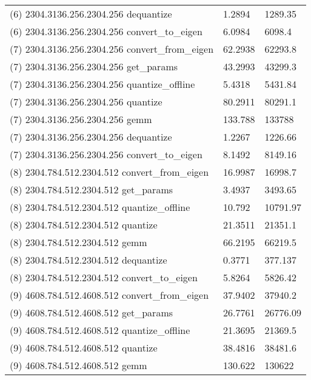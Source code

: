 \begin{longtable}{lll}
(6) 2304.3136.256.2304.256 dequantize            & 1.2894         & 1289.35          \\
(6) 2304.3136.256.2304.256 convert\_to\_eigen    & 6.0984         & 6098.4           \\
(7) 2304.3136.256.2304.256 convert\_from\_eigen  & 62.2938        & 62293.8          \\
(7) 2304.3136.256.2304.256 get\_params           & 43.2993        & 43299.3          \\
(7) 2304.3136.256.2304.256 quantize\_offline     & 5.4318         & 5431.84          \\
(7) 2304.3136.256.2304.256 quantize              & 80.2911        & 80291.1          \\
(7) 2304.3136.256.2304.256 gemm                  & 133.788        & 133788           \\
(7) 2304.3136.256.2304.256 dequantize            & 1.2267         & 1226.66          \\
(7) 2304.3136.256.2304.256 convert\_to\_eigen    & 8.1492         & 8149.16          \\
(8) 2304.784.512.2304.512 convert\_from\_eigen   & 16.9987        & 16998.7          \\
(8) 2304.784.512.2304.512 get\_params            & 3.4937         & 3493.65          \\
(8) 2304.784.512.2304.512 quantize\_offline      & 10.792         & 10791.97         \\
(8) 2304.784.512.2304.512 quantize               & 21.3511        & 21351.1          \\
(8) 2304.784.512.2304.512 gemm                   & 66.2195        & 66219.5          \\
(8) 2304.784.512.2304.512 dequantize             & 0.3771         & 377.137          \\
(8) 2304.784.512.2304.512 convert\_to\_eigen     & 5.8264         & 5826.42          \\
(9) 4608.784.512.4608.512 convert\_from\_eigen   & 37.9402        & 37940.2          \\
(9) 4608.784.512.4608.512 get\_params            & 26.7761        & 26776.09         \\
(9) 4608.784.512.4608.512 quantize\_offline      & 21.3695        & 21369.5          \\
(9) 4608.784.512.4608.512 quantize               & 38.4816        & 38481.6          \\
(9) 4608.784.512.4608.512 gemm                   & 130.622        & 130622           \\

\end{longtable}
